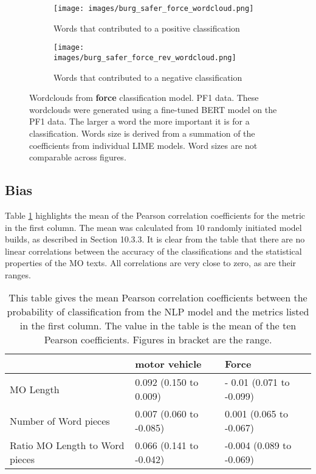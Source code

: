 \begin{figure}
     \centering
     \begin{subfigure}[b]{0.9\textwidth}
         \centering
         \texttt{[image: images/burg\_safer\_force\_wordcloud.png]}
         \caption{Words that contributed to a positive classification}
         \label{fig: wordcloud_force}
     \end{subfigure}
     \vfill
     \begin{subfigure}[b]{0.9\textwidth}
         \centering
         \texttt{[image: images/burg\_safer\_force\_rev\_wordcloud.png]}
         \caption{Words that contributed to a negative classification}
         \label{fig: wordcloud_mv_force}
     \end{subfigure}
        \caption[Wordclouds from \textbf{force} classification model. PF1 data.]{{Wordclouds from \textbf{force} classification model. PF1 data.} These wordclouds were generated using a fine-tuned BERT model on the PF1 data. The larger a word the more important it is for a classification. Words size is derived from a summation of the coefficients from individual LIME models. Word sizes are not comparable across figures.}
        \label{fig:wordcloud_mv_both}
        
\end{figure}

\subsection{Bias} Table \ref{tab:PF1_bias} highlights the mean of the Pearson correlation coefficients for the metric in the first column. The mean was calculated from 10 randomly initiated model builds, as described in Section 10.3.3. It is clear from the table that there are no linear correlations between the accuracy of the classifications and the statistical properties of the MO texts. All correlations are very close to zero, as are their ranges. 


\begin{table}[]
\begin{tabular}{@{}lll@{}}
\toprule
                               & motor vehicle            & Force                    \\ \midrule
MO Length                      & 0.092 (0.150 to 0.009)  & - 0.01 (0.071 to -0.099) \\
Number of Word pieces          & 0.007 (0.060 to -0.085) & 0.001 (0.065 to -0.067)  \\
Ratio MO Length to Word pieces & 0.066 (0.141 to -0.042) & -0.004 (0.089 to -0.069) \\ \bottomrule
\end{tabular}

\caption[PF1 data - bias results]{\label{tab:PF1_bias} This table gives the mean Pearson correlation coefficients between the probability of classification from the NLP model and the metrics listed in the first column.  The value in the table is the mean of the ten Pearson coefficients. Figures in bracket are the range.}
\end{table}





